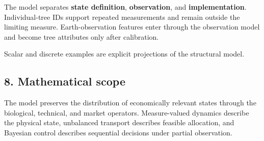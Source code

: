 The model separates \textbf{state definition}, \textbf{observation}, and \textbf{implementation}.
Individual-tree IDs support repeated measurements and remain outside the limiting
measure. Earth-observation features enter through the observation model and
become tree attributes only after calibration.

Scalar and discrete examples are explicit projections of the structural model.

\subsection{8. Mathematical scope}\label{mathematical-scope}

The model preserves the distribution of economically relevant states through the
biological, technical, and market operators. Measure-valued dynamics describe the
physical state, unbalanced transport describes feasible allocation, and Bayesian
control describes sequential decisions under partial observation.
